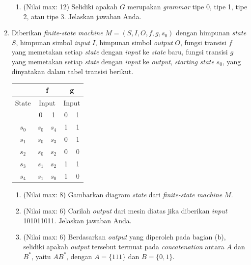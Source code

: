 \documentclass{article}
\begin{document}
\begin{enumerate}
\begin{enumerate}
        \item (Nilai max: 12) Selidiki apakah $G$ merupakan \textit{grammar} tipe 0, tipe 1, tipe 2, atau tipe 3. Jelaskan jawaban Anda.
    \end{enumerate}

    \item Diberikan \textit{finite-state machine} $M = (S, I, O, f, g, s_0)$ dengan himpunan \textit{state} $S$, himpunan simbol \textit{input} $I$, himpunan simbol \textit{output} $O$, fungsi transisi $f$ yang memetakan setiap \textit{state} dengan \textit{input} ke \textit{state} baru, fungsi transisi $g$ yang memetakan setiap \textit{state} dengan \textit{input} ke \textit{output}, \textit{starting state} $s_0$, yang dinyatakan dalam tabel transisi berikut.
    
    \begin{center}
        \begin{tabular}{|c|c|c|c|c|}
            \hline
            & \multicolumn{2}{c|}{f} & \multicolumn{2}{c|}{g} \\
            \hline
            State & \multicolumn{2}{c|}{Input} & \multicolumn{2}{c|}{Input} \\
            \hline
            & 0 & 1 & 0 & 1 \\
            \hline
            $s_0$ & $s_0$ & $s_4$ & 1 & 1 \\
            $s_1$ & $s_0$ & $s_3$ & 0 & 1 \\
            $s_2$ & $s_0$ & $s_2$ & 0 & 0 \\
            $s_3$ & $s_1$ & $s_2$ & 1 & 1 \\
            $s_4$ & $s_1$ & $s_0$ & 1 & 0 \\
            \hline
        \end{tabular}
    \end{center}
    
    \begin{enumerate}
        \item (Nilai max: 8) Gambarkan diagram \textit{state} dari \textit{finite-state machine} $M$.
        
        \item (Nilai max: 6) Carilah \textit{output} dari mesin diatas jika diberikan \textit{input} 101011011. Jelaskan jawaban Anda.
        
        \item (Nilai max: 6) Berdasarkan \textit{output} yang diperoleh pada bagian (b), selidiki apakah \textit{output} tersebut termuat pada \textit{concatenation} antara $A$ dan $B^*$, yaitu $AB^*$, dengan $A = \{111\}$ dan $B = \{0, 1\}$.
    \end{enumerate}


\end{enumerate}
\end{document}
